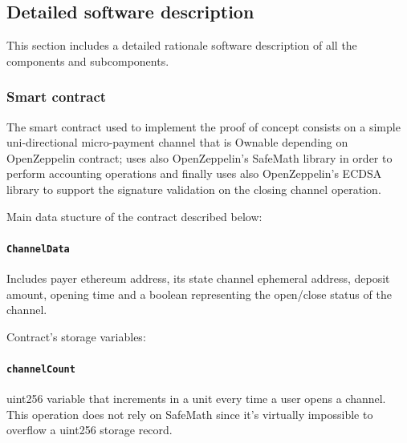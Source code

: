 \documentclass[12pt]{amsart}
\begin{document}
\begin{multicols}{2}
\subsection{Detailed software description}

\vspace{0.35cm}

This section includes a detailed rationale software description of all
the components and subcomponents.

\subsubsection{Smart contract}

\vspace{0.35cm}

The smart contract\cite{state-channel-contract-a} used
to implement the proof of concept consists on a simple
uni-directional micro-payment channel that is Ownable
depending on OpenZeppelin contract; uses also OpenZeppelin's
SafeMath library in order to perform accounting operations
and finally uses also OpenZeppelin's ECDSA library to support
the signature validation on the closing channel operation.

\vspace{0.35cm}

Main data stucture of the contract described below:

\vspace{0.35cm}

\paragraph{\texttt{ChannelData}} Includes payer ethereum address,
its state channel ephemeral address, deposit amount, opening time
and a boolean representing the open/close status of the channel.

\vspace{0.35cm}

Contract's storage variables:

\vspace{0.35cm}

\paragraph{\texttt{channelCount}} uint256 variable that increments
in a unit every time a user opens a channel. This operation
does not rely on SafeMath since it's virtually impossible to
overflow a uint256 storage record.


\end{multicols}
\end{document}
